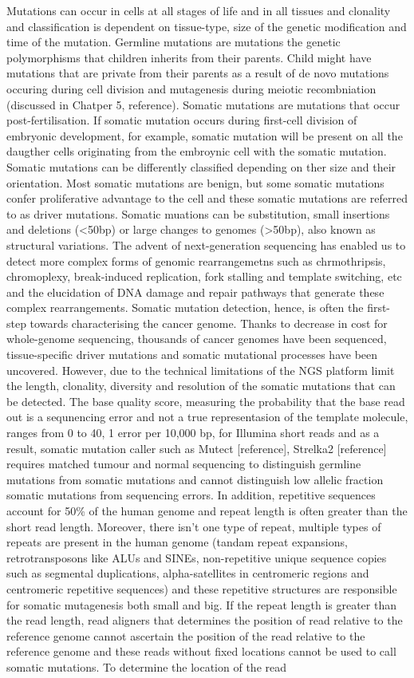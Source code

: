 Mutations can occur in cells at all stages of life and in all tissues and clonality and classification is dependent on tissue-type, size of the genetic modification and time of the mutation. Germline mutations are mutations the genetic polymorphisms that children inherits from their parents. Child might have mutations that are private from their parents as a result of de novo mutations occuring during cell division and mutagenesis during meiotic recombniation (discussed in Chatper 5, reference). Somatic mutations are mutations that occur post-fertilisation. If somatic mutation occurs during first-cell division of embryonic development, for example, somatic mutation will be present on all the daugther cells originating from the embroynic cell with the somatic mutation. Somatic mutations can be differently classified depending on ther size and their orientation. Most somatic mutations are benign, but some somatic mutations confer proliferative advantage to the cell and these somatic mutations are referred to as driver mutations. Somatic muations can be substitution, small insertions and deletions (<50bp) or large changes to genomes (>50bp), also known as structural variations. The advent of next-generation sequencing has enabled us to detect more complex forms of genomic rearrangemetns such as chrmothripsis, chromoplexy, break-induced replication, fork stalling and template switching, etc and the elucidation of DNA damage and repair pathways that generate these complex rearrangements. Somatic mutation detection, hence, is often the first-step towards characterising the cancer genome. Thanks to decrease in cost for whole-genome sequencing, thousands of cancer genomes have been sequenced, tissue-specific driver mutations and somatic mutational processes have been uncovered. However, due to the technical limitations of the NGS platform limit the length, clonality, diversity and resolution of the somatic mutations that can be detected. The base quality score, measuring the probability that the base read out is a sequnencing error and not a true representasion of the template molecule, ranges from 0 to 40, 1 error per 10,000 bp, for Illumina short reads and as a result, somatic mutation caller such as Mutect [reference], Strelka2 [reference] requires matched tumour and normal sequencing to distinguish germline mutations from somatic mutations and cannot distinguish low allelic fraction somatic mutations from sequencing errors. In addition, repetitive sequences account for 50\% of the human genome and repeat length is often greater than the short read length. Moreover, there isn't one type of repeat, multiple types of repeats are present in the human genome (tandam repeat expansions, retrotransposons like ALUs and SINEs, non-repetitive unique sequence copies such as segmental duplications, alpha-satellites in centromeric regions and centromeric repetitive sequences) and these repetitive structures are responsible for somatic mutagenesis both small and big. If the repeat length is greater than the read length, read aligners that determines the position of read relative to the reference genome cannot ascertain the position of the read relative to the reference genome and these reads without fixed locations cannot be used to call somatic mutations. To determine the location of the read 